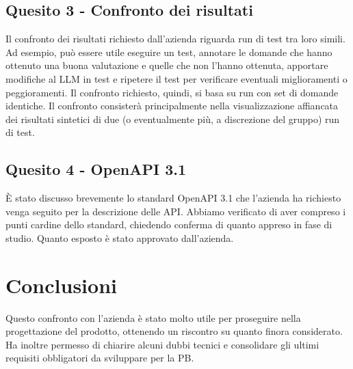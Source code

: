 \documentclass[10pt]{article}
\begin{document}
\subsection{Quesito 3 - Confronto dei risultati}
Il confronto dei risultati richiesto dall’azienda riguarda run di test tra loro simili. Ad esempio, può essere utile eseguire un test, annotare le domande che hanno ottenuto una buona valutazione e quelle che non l’hanno ottenuta, apportare modifiche al LLM in test e ripetere il test per verificare eventuali miglioramenti o peggioramenti.
Il confronto richiesto, quindi, si basa su run con set di domande identiche.
Il confronto consisterà principalmente nella visualizzazione affiancata dei risultati sintetici di due (o eventualmente più, a discrezione del gruppo) run di test.

\subsection{Quesito 4 - OpenAPI 3.1}
È stato discusso brevemente lo standard OpenAPI 3.1 che l'azienda ha richiesto venga seguito per la descrizione delle API.  
Abbiamo verificato di aver compreso i punti cardine dello standard, chiedendo conferma di quanto appreso in fase di studio.  
Quanto esposto è stato approvato dall'azienda.


\section{Conclusioni}
Questo confronto con l'azienda è stato molto utile per proseguire nella progettazione del prodotto, ottenendo un riscontro su quanto finora considerato.  
Ha inoltre permesso di chiarire alcuni dubbi tecnici e consolidare gli ultimi requisiti obbligatori da sviluppare per la PB.
    
    \newpage
    \newpage
\end{document}
